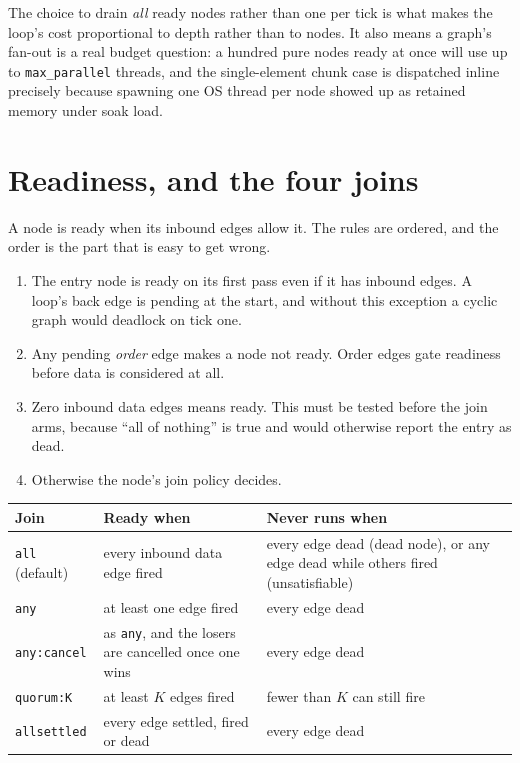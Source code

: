 The choice to drain \emph{all} ready nodes rather than one per tick is what makes the loop's cost
proportional to depth rather than to nodes. It also means a graph's fan-out is a real budget
question: a hundred pure nodes ready at once will use up to \texttt{max\_parallel} threads, and the
single-element chunk case is dispatched inline precisely because spawning one OS thread per node
showed up as retained memory under soak load.

\section{Readiness, and the four joins}

A node is ready when its inbound edges allow it. The rules are ordered, and the order is the part
that is easy to get wrong.

\begin{enumerate}
	\item The entry node is ready on its first pass even if it has inbound edges. A loop's back
	edge is pending at the start, and without this exception a cyclic graph would deadlock on tick
	one.
	\item Any pending \emph{order} edge makes a node not ready. Order edges gate readiness before
	data is considered at all.
	\item Zero inbound data edges means ready. This must be tested before the join arms, because
	\enquote{all of nothing} is true and would otherwise report the entry as dead.
	\item Otherwise the node's join policy decides.
\end{enumerate}

\begin{center}
\footnotesize
\begin{tabular}{@{}p{}p{}p{}@{}}
	\toprule
	\textbf{Join} & \textbf{Ready when} & \textbf{Never runs when} \\
	\midrule
	\texttt{all} (default) & every inbound data edge fired & every edge dead (dead node), or any edge
	dead while others fired (unsatisfiable) \\
	\texttt{any} & at least one edge fired & every edge dead \\
	\texttt{any:cancel} & as \texttt{any}, and the losers are cancelled once one wins & every edge
	dead \\
	\texttt{quorum:K} & at least $K$ edges fired & fewer than $K$ can still fire \\
	\texttt{allsettled} & every edge settled, fired or dead & every edge dead \\
	\bottomrule
\end{tabular}
\end{center}

